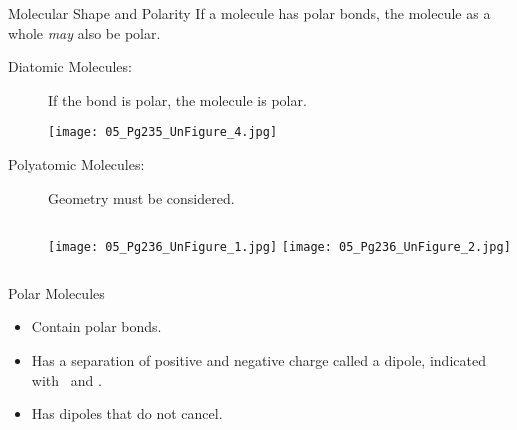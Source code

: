 \documentclass[notes=hide]{beamer}
\begin{document}
\begin{frame}{Molecular Shape and Polarity}
	If a molecule has polar bonds, the molecule as a whole \emph{may}
	also be polar. \pause

	\begin{description}
		\item[Diatomic Molecules:] If the bond is polar, the molecule is
			polar.
	  \begin{center}
	  	\texttt{[image: 05\_Pg235\_UnFigure\_4.jpg]}
	  \end{center}

  \item[Polyatomic Molecules:] \alert{Geometry} must be considered.

		\begin{columns}
			\centering
			\texttt{[image: 05\_Pg236\_UnFigure\_1.jpg]}
			\centering
			\texttt{[image: 05\_Pg236\_UnFigure\_2.jpg]}
		\end{columns}
\end{description}
\end{frame}

\begin{frame}{Polar Molecules}
	\begin{itemize}
		\item Contain \alert{polar} bonds.
		\item Has a separation of positive and negative charge called a
			dipole, indicated with \delp\ and \delm.
		\item Has dipoles that \alert{do not} cancel.
	\end{itemize}

	\bigskip

	\begin{center}
		\hspace{5em}
	\end{center}
\end{frame}
\end{document}
